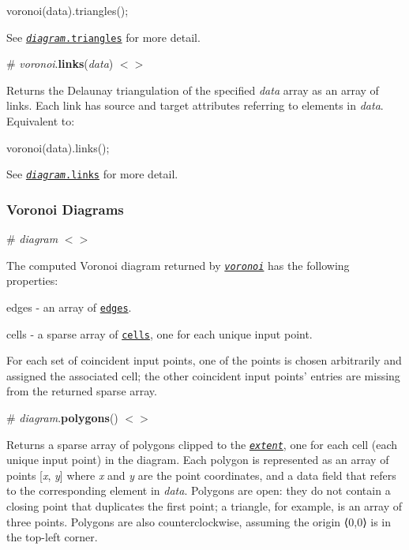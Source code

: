 \begin{DoxyCode}
voronoi(data).triangles();
\end{DoxyCode}


See \href{#diagram_triangles}{\tt {\itshape diagram}.triangles} for more detail.

\label{_voronoi_links}%
\# {\itshape voronoi}.{\bfseries links}({\itshape data}) \href{https://github.com/d3/d3-voronoi/blob/master/src/voronoi.js#L23}{\tt $<$$>$}

Returns the Delaunay triangulation of the specified {\itshape data} array as an array of links. Each link has {\ttfamily source} and {\ttfamily target} attributes referring to elements in {\itshape data}. Equivalent to\+:


\begin{DoxyCode}
voronoi(data).links();
\end{DoxyCode}


See \href{#diagram_links}{\tt {\itshape diagram}.links} for more detail.

\subsubsection*{Voronoi Diagrams}

\label{_diagram}%
\# {\itshape diagram} \href{https://github.com/d3/d3-voronoi/blob/master/src/Diagram.js}{\tt $<$$>$}

The computed Voronoi diagram returned by \href{#_voronoi}{\tt {\itshape voronoi}} has the following properties\+:


\begin{DoxyItemize}
\item {\ttfamily edges} -\/ an array of \href{#diagram_edge}{\tt edges}.
\item {\ttfamily cells} -\/ a sparse array of \href{#diagram_cell}{\tt cells}, one for each unique input point.
\end{DoxyItemize}

For each set of coincident input points, one of the points is chosen arbitrarily and assigned the associated cell; the other coincident input points’ entries are missing from the returned sparse array.

\label{_diagram_polygons}%
\# {\itshape diagram}.{\bfseries polygons}() \href{https://github.com/d3/d3-voronoi/blob/master/src/Diagram.js#L72}{\tt $<$$>$}

Returns a sparse array of polygons clipped to the \href{#voronoi_extent}{\tt {\itshape extent}}, one for each cell (each unique input point) in the diagram. Each polygon is represented as an array of points \mbox{[}{\itshape x}, {\itshape y}\mbox{]} where {\itshape x} and {\itshape y} are the point coordinates, and a {\ttfamily data} field that refers to the corresponding element in {\itshape data}. Polygons are open\+: they do not contain a closing point that duplicates the first point; a triangle, for example, is an array of three points. Polygons are also counterclockwise, assuming the origin ⟨0,0⟩ is in the top-\/left corner.

